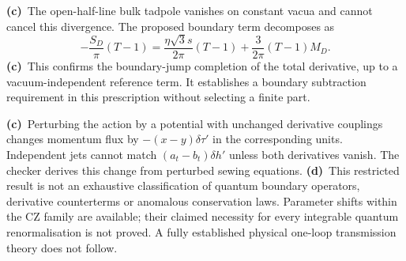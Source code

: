 \documentclass[11pt,a4paper]{article}
\newcommand{\Lc}{\textbf{(c)}\ }
\newcommand{\Ld}{\textbf{(d)}\ }
\begin{document}
\Lc The open-half-line bulk tadpole vanishes on constant vacua and cannot
cancel this divergence. The proposed boundary term decomposes as
\begin{equation}
 -\frac{S_D}{\pi}(T-1)
 =\frac{\eta\sqrt3 s}{2\pi}(T-1)+\frac3{2\pi}(T-1)M_D.
\end{equation}
\Lc This confirms the boundary-jump completion of the total derivative,
up to a vacuum-independent reference term. It establishes a boundary
subtraction requirement in this prescription without selecting a finite part.

\Lc Perturbing the action by a potential with unchanged derivative couplings
changes momentum flux by $-(x-y)\delta\tau'$ in the corresponding units.
Independent jets cannot match $(a_t-b_t)\delta h'$ unless both derivatives
vanish. The checker derives this change from perturbed sewing equations.
\Ld This restricted result is not an exhaustive classification of quantum
boundary operators, derivative counterterms or anomalous conservation laws.
Parameter shifts within the CZ family are available; their claimed necessity
for every integrable quantum renormalisation is not proved. A fully
established physical one-loop transmission theory does not follow.
\end{document}
